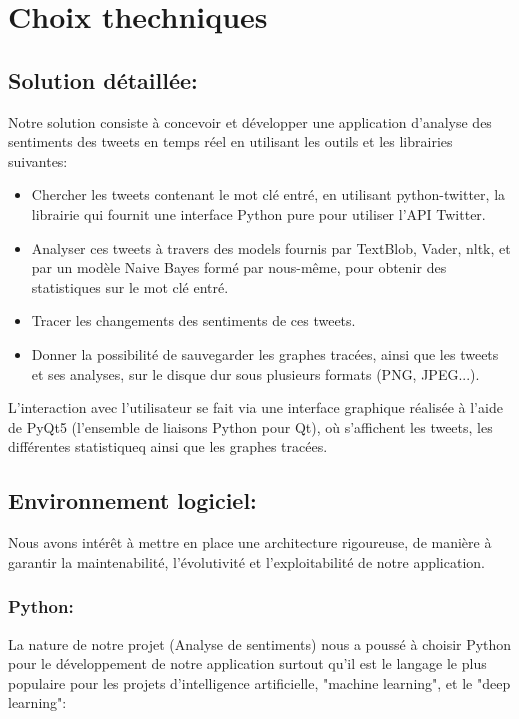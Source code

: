 \chapter{Choix thechniques}
\section{Solution détaillée:}
Notre solution consiste à concevoir et développer une application d'analyse des sentiments des tweets en temps réel en utilisant les outils et les librairies suivantes: 
\begin{itemize}
    \item Chercher les tweets contenant le mot clé entré, en utilisant \textcolor{DispositionColor}{python-twitter}, la librairie qui fournit une interface Python pure pour utiliser l'API Twitter.
    \item Analyser ces tweets à travers des models fournis par \textcolor{DispositionColor}{TextBlob}, \textcolor{DispositionColor}{Vader}, \textcolor{DispositionColor}{nltk}, et par un modèle Naive Bayes formé par nous-même, pour obtenir des statistiques sur le mot clé entré.
    \item Tracer les changements des sentiments de ces tweets.
    \item Donner la possibilité de sauvegarder les graphes tracées, ainsi que les tweets et ses analyses, sur le disque dur sous plusieurs formats (PNG, JPEG...).
\end{itemize}   
L'interaction avec l'utilisateur se fait via une interface graphique réalisée à l'aide de \textcolor{DispositionColor}{PyQt5} (l'ensemble de liaisons Python pour Qt), où s'affichent les tweets, les différentes statistiqueq ainsi que les graphes tracées. 
\section{Environnement logiciel:}
Nous avons intérêt à mettre en place une architecture rigoureuse, de manière à garantir la
maintenabilité, l'évolutivité et l'exploitabilité de notre application.
\subsection{Python:}
La nature de notre projet (Analyse de sentiments) nous a poussé à choisir Python pour le développement de notre application surtout qu'il est le langage le plus populaire pour les projets d'intelligence artificielle, "machine learning", et le "deep learning": \cite{python} \\

